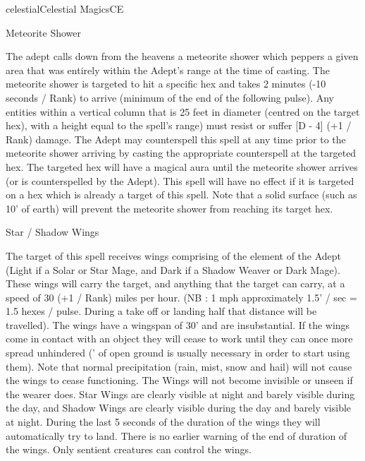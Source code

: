 \begin{college}[1.3]{celestial}{Celestial Magics}{CE}
\begin{spell}[S-4]{Meteorite Shower}

\begin{effects}
The adept calls down from the heavens a meteorite shower which peppers
a given area that was entirely within the Adept's range at the time of
casting.  The meteorite shower is targeted to hit a specific hex and
takes 2 minutes (-10 seconds / Rank) to arrive (minimum of the end of
the following pulse).  Any entities within a vertical column that is
25 feet in diameter (centred on the target hex), with a height equal
to the spell's range) must resist or suffer [D - 4] (+1 / Rank)
damage.  The Adept may counterspell this spell at any time prior to
the meteorite shower arriving by casting the appropriate counterspell
at the targeted hex.  The targeted hex will have a magical aura until
the meteorite shower arrives (or is counterspelled by the Adept).
This spell will have no effect if it is targeted on a hex which is
already a target of this spell.  Note that a solid surface (such as
10' of earth) will prevent the meteorite shower from reaching its
target hex.
\end{effects}
\end{spell}

\begin{spell}[S-5]{Star / Shadow Wings}

\begin{effects}
The target of this spell receives wings comprising of the element of
the Adept (\ie Light if a Solar or Star Mage, and Dark if a Shadow
Weaver or Dark Mage).  These wings will carry the target, and anything
that the target can carry, at a speed of 30 (+1 / Rank) miles per
hour.  (NB : 1 mph approximately 1.5' / sec = 1.5 hexes / pulse.
During a take off or landing half that distance will be travelled).
The wings have a wingspan of 30' and are insubstantial.  If the wings
come in contact with an object they will cease to work until they can
once more spread unhindered (' of open ground is usually
necessary in order to start using them).  Note that normal
precipitation (\ie rain, mist, snow and hail) will not cause the wings
to cease functioning.  The Wings will not become invisible or unseen
if the wearer does.  Star Wings are clearly visible at night and
barely visible during the day, and Shadow Wings are clearly visible
during the day and barely visible at night.  During the last 5 seconds
of the duration of the wings they will automatically try to land.
There is no earlier warning of the end of duration of the wings.  Only
sentient creatures can control the wings.


\end{effects}
\end{spell}
\end{college}
